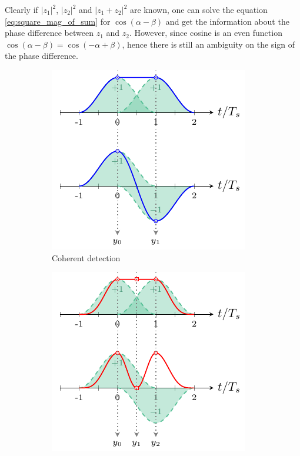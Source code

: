 Clearly if $|z_1|^2$, $|z_2|^2$ and $|z_1+z_2|^2$ are known, one can solve the equation \ref{eq:square_mag_of_sum} for $\cos(\alpha-\beta)$ and get the information about the phase difference between $z_1$ and $z_2$. However, since cosine is an even function $\cos(\alpha-\beta)=\cos(-\alpha+\beta)$, hence there is still an ambiguity on the sign of the phase difference.\\


\begin{figure}[htb]
     \centering
     \begin{subfigure}[b]{0.49\textwidth}
         \centering
         \includegraphics[width=\textwidth]{images/CD_toy_example.pdf}
         \caption{Coherent detection}
         \label{fig:CD_toy_example}
     \end{subfigure}
     \hfill
     \begin{subfigure}[b]{0.49\textwidth}
         \centering
         \includegraphics[width=\textwidth]{images/DD_toy_example.pdf}

\end{subfigure}
\end{figure}

